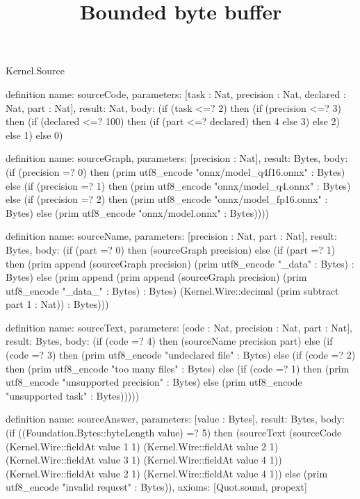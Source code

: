 \begin{lexlean}{Kernel.Source}
\title{Bounded byte buffer}
\begin{semanticmodule}
definition{
  name: sourceCode,
  parameters: [task : Nat, precision : Nat, declared : Nat, part : Nat],
  result: Nat,
  body: (if (task <=? 2) then (if (precision <=? 3) then (if (declared <=? 100) then (if (part <=? declared) then 4 else 3) else 2) else 1) else 0)
}

definition{
  name: sourceGraph,
  parameters: [precision : Nat],
  result: Bytes,
  body: (if (precision =? 0) then (prim utf8_encode "onnx/model_q4f16.onnx" : Bytes) else (if (precision =? 1) then (prim utf8_encode "onnx/model_q4.onnx" : Bytes) else (if (precision =? 2) then (prim utf8_encode "onnx/model_fp16.onnx" : Bytes) else (prim utf8_encode "onnx/model.onnx" : Bytes))))
}

definition{
  name: sourceName,
  parameters: [precision : Nat, part : Nat],
  result: Bytes,
  body: (if (part =? 0) then (sourceGraph precision) else (if (part =? 1) then (prim append (sourceGraph precision) (prim utf8_encode "_data" : Bytes) : Bytes) else (prim append (prim append (sourceGraph precision) (prim utf8_encode "_data_" : Bytes) : Bytes) (Kernel.Wire::decimal (prim subtract part 1 : Nat)) : Bytes)))
}

definition{
  name: sourceText,
  parameters: [code : Nat, precision : Nat, part : Nat],
  result: Bytes,
  body: (if (code =? 4) then (sourceName precision part) else (if (code =? 3) then (prim utf8_encode "undeclared file" : Bytes) else (if (code =? 2) then (prim utf8_encode "too many files" : Bytes) else (if (code =? 1) then (prim utf8_encode "unsupported precision" : Bytes) else (prim utf8_encode "unsupported task" : Bytes)))))
}

definition{
  name: sourceAnswer,
  parameters: [value : Bytes],
  result: Bytes,
  body: (if ((Foundation.Bytes::byteLength value) =? 5) then (sourceText (sourceCode (Kernel.Wire::fieldAt value 1 1) (Kernel.Wire::fieldAt value 2 1) (Kernel.Wire::fieldAt value 3 1) (Kernel.Wire::fieldAt value 4 1)) (Kernel.Wire::fieldAt value 2 1) (Kernel.Wire::fieldAt value 4 1)) else (prim utf8_encode "invalid request" : Bytes)),
  axioms: [Quot.sound, propext]
}
\end{semanticmodule}
\end{lexlean}
